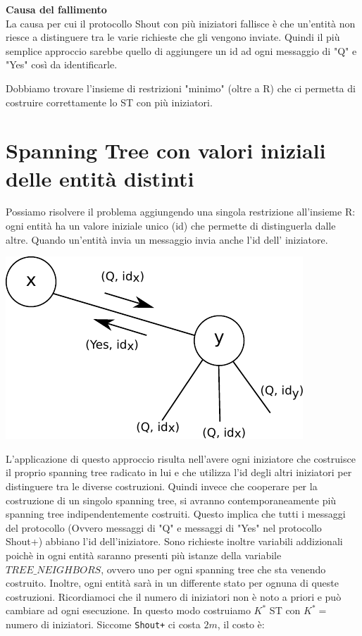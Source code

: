 \textbf{Causa del fallimento}\\
La causa per cui il protocollo Shout con più iniziatori fallisce è che un'entità
non riesce a distinguere tra le varie richieste che gli vengono inviate. Quindi
il più semplice approccio sarebbe quello di aggiungere un id ad ogni messaggio
di "Q" e "Yes" così da identificarle.

Dobbiamo trovare l'insieme di restrizioni "minimo" (oltre a R) che ci permetta
di costruire correttamente lo ST con più iniziatori.

\section{Spanning Tree con valori iniziali delle entità distinti}
Possiamo risolvere il problema aggiungendo una singola restrizione all'insieme
R: ogni entità ha un valore iniziale unico (id) che permette di distinguerla
dalle altre. Quando un'entità invia un messaggio invia anche l'id dell'
iniziatore.

\begin{center}
    \includegraphics[scale=0.8]{images/n_38}
\end{center}

L'applicazione di questo approccio risulta nell'avere ogni iniziatore che
costruisce il proprio spanning tree radicato in lui e che utilizza l'id degli
altri iniziatori per distinguere tra le diverse costruzioni. Quindi invece che
cooperare per la costruzione di un singolo spanning tree, si avranno
contemporaneamente più spanning tree indipendentemente costruiti. Questo implica
che  tutti i messaggi del protocollo (Ovvero messaggi di "Q" e messaggi di "Yes"
nel protocollo Shout+) abbiano l'id dell'iniziatore. Sono richieste inoltre
variabili addizionali poichè in ogni entità saranno presenti più istanze della
variabile $TREE\_NEIGHBORS$, ovvero uno per ogni spanning tree che sta venendo
costruito. Inoltre, ogni entità sarà in un differente stato per ognuna di queste
costruzioni. Ricordiamoci che il numero di iniziatori non è noto a priori e può
cambiare ad ogni esecuzione. In questo modo costruiamo $K^*$ ST con $K^*=$
numero di iniziatori. Siccome \texttt{Shout+} ci costa $2m$, il costo è:

